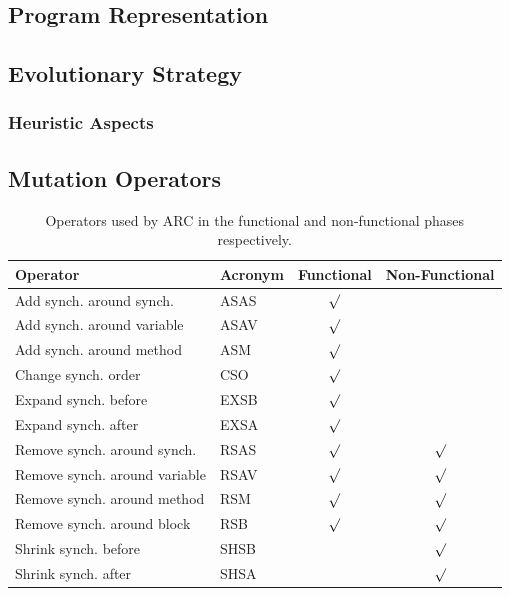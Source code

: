 \documentclass[10pt, conference, compsocconf]{IEEEtran}
\begin{document}
\subsection{Program Representation}
\label{sec:programrepresentation}



\subsection{Evolutionary Strategy}
\label{sec:evolutionarystrategy}



\subsubsection{Heuristic Aspects}
\label{sec:heuristicaspects}



\subsection{Mutation Operators}
\label{sec:mutationoperators}

\begin{table}
\begin{center}
\begin{tabular}{|l|l|c|c|}
\hline
\textbf{Operator} &
\textbf{Acronym} &
\textbf{Functional} &
\textbf{Non-Functional}
\\\hline
Add synch. around synch. & ASAS & $\surd$ &
\\\hline
Add synch. around variable & ASAV & $\surd$ &
\\\hline
Add synch. around method & ASM & $\surd$ &
\\\hline
Change synch. order & CSO & $\surd$ &
\\\hline
Expand synch. before & EXSB & $\surd$ &
\\\hline
Expand synch. after & EXSA & $\surd$ &
\\\hline
Remove synch. around synch. & RSAS & $\surd$ & $\surd$
\\\hline
Remove synch. around variable & RSAV & $\surd$ & $\surd$
\\\hline
Remove synch. around method & RSM & $\surd$ & $\surd$
\\\hline
Remove synch. around block & RSB & $\surd$ & $\surd$
\\\hline
Shrink synch. before & SHSB & & $\surd$
\\\hline
Shrink synch. after & SHSA & & $\surd$
\\\hline
\end{tabular}
\caption{Operators used by ARC in the functional and non-functional phases
respectively.}
\label{tbl:operators}
\end{center}
\end{table}
\end{document}
